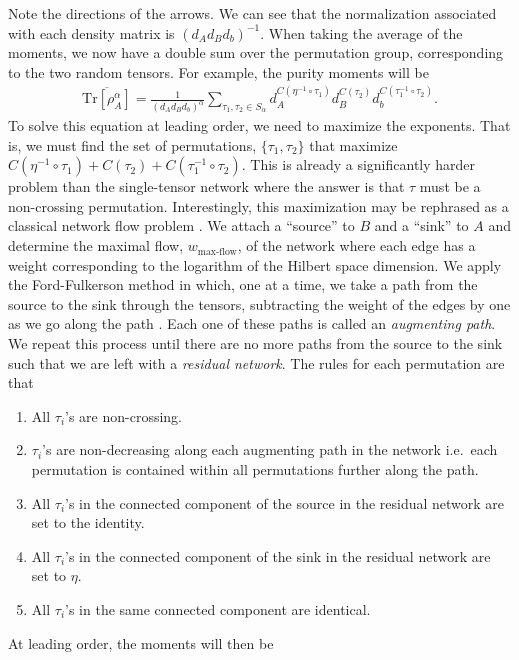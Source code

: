 \documentclass[a4paper,11pt]{article}
\newcommand{\Tr}{\text{Tr}}
\begin{document}
Note the directions of the arrows. We can see that the normalization associated with each density matrix is $(d_A d_Bd_b)^{-1}$.
When taking the average of the moments, we now have a double sum over the permutation group, corresponding to the two random tensors. For example, the purity moments will be
\begin{align}
    \overline{\Tr\left[ \rho_A^{\alpha}\right]} = \frac{1}{(d_A d_B d_b)^{\alpha}} \sum_{\tau_1, \tau_2 \in S_{\alpha}} d_A^{C(\eta^{-1}\circ \tau_1)} d_B^{C(\tau_2)}d_b^{C(\tau_1^{-1} \circ \tau_2)}.
\end{align}
To solve this equation at leading order, we need to maximize the exponents. That is, we must find the set of permutations, $\{\tau_1,\tau_2\}$ that maximize $C(\eta^{-1}\circ \tau_1) + C(\tau_2) + C(\tau_1^{-1} \circ \tau_2)$. This is already a significantly harder problem than the single-tensor network where the answer is that $\tau$ must be a non-crossing permutation. Interestingly, this maximization may be rephrased as a classical network flow problem \cite{2010JPhA...43A5303C}. We attach a ``source'' to $B$ and a ``sink'' to $A$ and determine the maximal flow, $w_{\text{max-flow}}$, of the network where each edge has a weight corresponding to the logarithm of the Hilbert space dimension. We apply the Ford-Fulkerson method in which, one at a time, we take a path from the source to the sink through the tensors, subtracting the weight of the edges by one as we go along the path \cite{ford_fulkerson_1956}. Each one of these paths is called an \textit{augmenting path}. We repeat this process until there are no more paths from the source to the sink such that we are left with a \textit{residual network}. The rules for each permutation are that
\begin{enumerate}
    \item All $\tau_i$'s are non-crossing.
    \item $\tau_i$'s are non-decreasing along each augmenting path in the network i.e.~each permutation is contained within all permutations further along the path. 
    \item All $\tau_i$'s in the connected component of the source in the residual network are set to the identity.
    \item All $\tau_i$'s in the connected component of the sink in the residual network are set to $\eta$.
    \item All $\tau_i$'s in the same connected component are identical. 
\end{enumerate}
At leading order, the moments will then be
\end{document}
